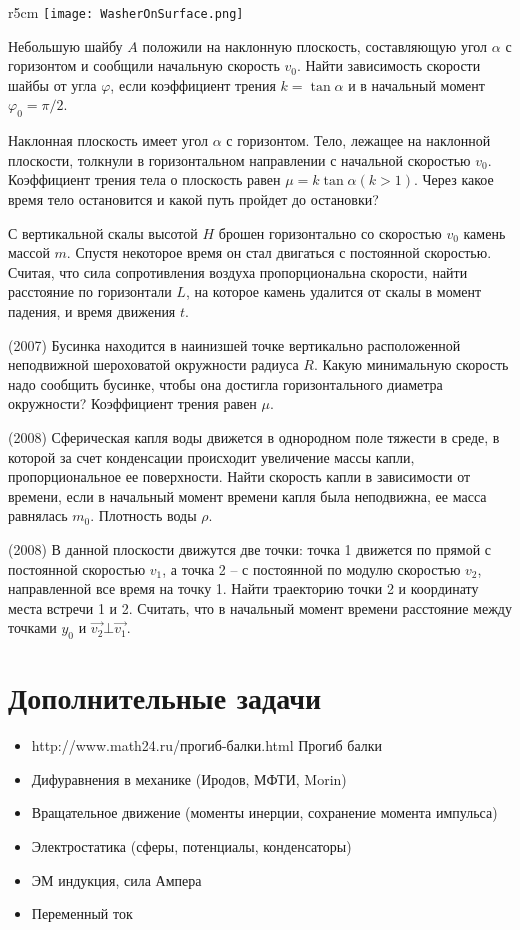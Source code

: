 \begin{wrapfigure}{r}{5cm}
\texttt{[image: WasherOnSurface.png]}
\end{wrapfigure}
\AddProb Небольшую шайбу $A$ положили на наклонную плоскость, составляющую угол $\alpha$ с горизонтом и сообщили начальную скорость $v_0$. Найти зависимость скорости шайбы от угла $\varphi$, если коэффициент трения $k = \tan \alpha$ и в начальный момент $\varphi_0 = \pi/2$.

\AddProb Наклонная плоскость имеет угол $\alpha$ с горизонтом. Тело, лежащее на наклонной плоскости, толкнули в горизонтальном направлении с начальной скоростью $v_0$. Коэффициент трения тела о плоскость равен $\mu = k \tan \alpha (k > 1)$. Через какое время тело остановится и какой путь пройдет до остановки?

\AddProb С вертикальной скалы высотой $H$ брошен горизонтально со скоростью $v_0$ камень массой $m$. Спустя некоторое время он стал двигаться с постоянной скоростью. Считая, что сила сопротивления воздуха пропорциональна скорости, найти расстояние по горизонтали $L$, на которое камень удалится от скалы в момент падения, и время движения $t$.

\AddProb (2007) Бусинка находится в наинизшей точке вертикально расположенной неподвижной шероховатой окружности радиуса $R$. Какую минимальную скорость надо сообщить бусинке, чтобы она достигла горизонтального диаметра окружности? Коэффициент трения равен $\mu$.

\AddProb (2008) Сферическая капля воды движется в однородном поле тяжести в среде, в которой за счет конденсации происходит увеличение массы капли, пропорциональное ее поверхности. Найти скорость капли в зависимости от времени, если в начальный момент времени капля была неподвижна, ее масса равнялась $m_0$. Плотность воды $\rho$.

\AddProb (2008) В данной плоскости движутся две точки: точка 1 движется по прямой с постоянной скоростью $v_1$, а точка 2 – с постоянной по модулю скоростью $v_2$, направленной все время на точку 1. Найти траекторию точки 2 и координату места встречи 1 и 2. Считать, что в начальный момент времени расстояние между точками $y_0$ и $\vec{v_2} \bot \vec{v_1}$.

\section{Дополнительные задачи}
\begin{itemize}
\item http://www.math24.ru/прогиб-балки.html Прогиб балки
\item Дифуравнения в механике (Иродов, МФТИ, Morin)
\item Вращательное движение (моменты инерции, сохранение момента импульса)
\item Электростатика (сферы, потенциалы, конденсаторы)
\item ЭМ индукция, сила Ампера
\item Переменный ток 
\end{itemize}